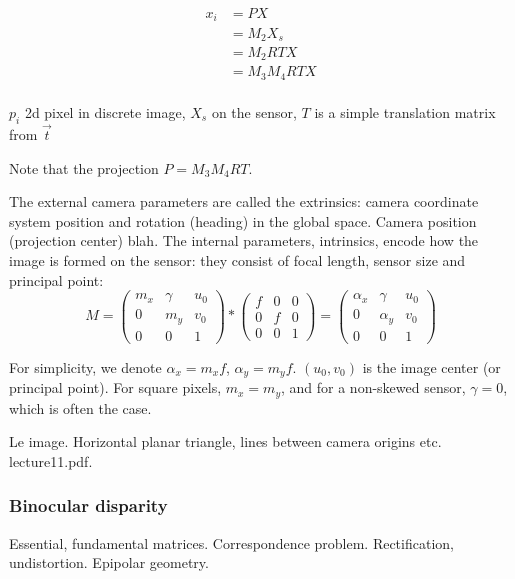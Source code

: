 \begin{align}
	x_i &= P X\\
	  &= M_2 X_s\\ %
	  &= M_2 R T X\\
	  &= M_3 M_4 R T X\\ %
\end{align}

$p_i$ 2d pixel in discrete image, $X_s$ on the sensor, $T$ is a simple translation matrix from $\vec t$

Note that the projection $P = M_3 M_4 R T$.

The external camera parameters are called the extrinsics: camera coordinate system position and rotation (heading) in the global space.
Camera position (projection center) blah.
The internal parameters, intrinsics, encode how the image is formed on the sensor: they consist of focal length, sensor size and principal point:
\begin{equation}
	M =
	\begin{pmatrix}
		m_x & \gamma & u_0\\
		0   &    m_y & v_0\\
		0   &        0 & 1
	\end{pmatrix}
	*
	\begin{pmatrix}
		f & 0 & 0\\
		0 & f & 0\\
		0 & 0 & 1
	\end{pmatrix}
	=
	\begin{pmatrix}
		\alpha_x & \gamma   & u_0\\
		0        & \alpha_y & v_0\\
		0        & 0        & 1
	\end{pmatrix}
\end{equation}

For simplicity, we denote $\alpha_x = m_x f$, $\alpha_y = m_y f$. $(u_0, v_0)$ is the image center (or principal point). For square pixels, $m_x = m_y$, and for a non-skewed sensor, $\gamma = 0$, which is often the case.

Le image. Horizontal planar triangle, lines between camera origins etc. lecture11.pdf.

\subsubsection{Binocular disparity}

Essential, fundamental matrices. Correspondence problem. Rectification, undistortion. Epipolar geometry.

